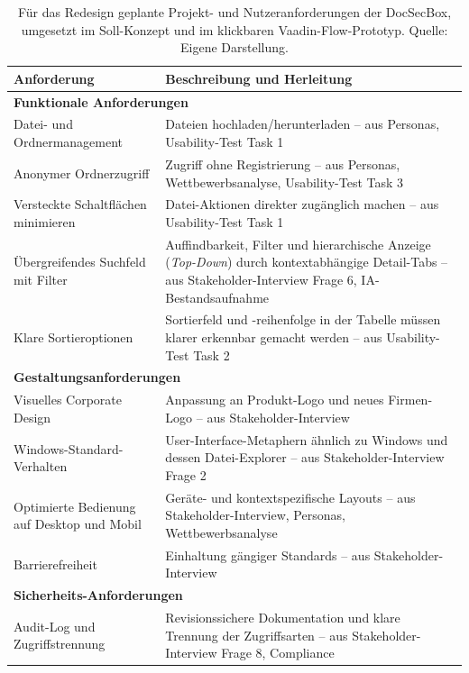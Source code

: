 \begin{table}[H]
    \centering
    \scriptsize
    \begin{tabular}{p{5.0cm} p{9.5cm}}
        \toprule
        \textbf{Anforderung} & \textbf{Beschreibung und Herleitung} \\
        \midrule
        \multicolumn{2}{l}{\textbf{Funktionale Anforderungen}} \\
        \midrule
        Datei- und Ordnermanagement & Dateien hochladen/herunterladen -- aus Personas, Usability-Test Task 1 \\
        Anonymer Ordnerzugriff & Zugriff ohne Registrierung -- aus Personas, Wettbewerbsanalyse, Usability-Test Task 3 \\
        Versteckte Schaltflächen minimieren & Datei-Aktionen direkter zugänglich machen -- aus Usability-Test Task 1 \\
        Übergreifendes Suchfeld mit Filter & Auffindbarkeit, Filter und hierarchische Anzeige (\emph{Top-Down}) durch kontextabhängige Detail-Tabs -- aus Stakeholder-Interview Frage 6, IA-Bestandsaufnahme\\
        Klare Sortieroptionen & Sortierfeld und -reihenfolge in der Tabelle müssen klarer erkennbar gemacht werden -- aus Usability-Test Task 2 \\
        \midrule
        \multicolumn{2}{l}{\textbf{Gestaltungsanforderungen}} \\
        \midrule
        Visuelles Corporate Design & Anpassung an Produkt-Logo und neues Firmen-Logo -- aus Stakeholder-Interview \\
        Windows-Standard-Verhalten & User-Interface-Metaphern ähnlich zu Windows und dessen Datei-Explorer -- aus Stakeholder-Interview Frage 2 \\
        Optimierte Bedienung auf Desktop und Mobil & Geräte- und kontextspezifische Layouts -- aus Stakeholder-Interview, Personas, Wettbewerbsanalyse \\
        Barrierefreiheit & Einhaltung gängiger Standards -- aus Stakeholder-Interview \\
        \midrule
        \multicolumn{2}{l}{\textbf{Sicherheits-Anforderungen}} \\
        \midrule
        Audit-Log und Zugriffstrennung & Revisionssichere Dokumentation und klare Trennung der Zugriffsarten -- aus Stakeholder-Interview Frage 8, Compliance \\
        \midrule
    \end{tabular}
    \caption[Geplante und umgesetzte Anforderungen]{Für das Redesign geplante Projekt- und Nutzeranforderungen der DocSecBox, umgesetzt im Soll-Konzept und im klickbaren Vaadin-Flow-Prototyp. Quelle: Eigene Darstellung.}
    \label{tab:priorisierte_anforderungen}
\end{table}
